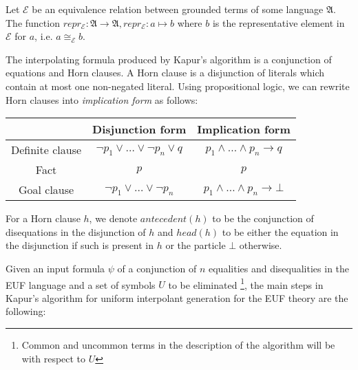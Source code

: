\begin{definition}
  Let $\mathcal{E}$ be an equivalence relation between grounded terms of some 
  language $\mathfrak{A}$. The function $repr_{\mathcal{E}} : \mathfrak{A} \rightarrow 
  \mathfrak{A} , repr_{\mathcal{E}} : a \mapsto b$  where $b$ is the representative
  element in $\mathcal{E}$ for $a$, i.e. $a \cong_{\mathcal{E}} b$.

\end{definition}

The interpolating formula produced by Kapur's algorithm is 
a conjunction of equations
and Horn clauses. A Horn clause is a disjunction of literals which 
contain at most
one non-negated literal. Using propositional logic, we can rewrite
Horn clauses into \emph{implication form} as follows:

\begin{table}[H]
  \centering
  \begin{tabular}{c|c|c}
    \toprule
    {} & Disjunction form & Implication form \\
    \toprule
    Definite clause & $\neg p_1 \lor \dots \lor \neg p_n \lor q$ & $p_1 \land \dots \land p_n \rightarrow q$ \\
    \midrule
    Fact & $p$ & $p$ \\
    \midrule
    Goal clause & $\neg p_1 \lor \dots \lor \neg p_n$ & $p_1 \land \dots \land p_n \rightarrow \bot$ \\
    \bottomrule
  \end{tabular}
\end{table}

For a Horn clause $h$,
we denote $antecedent(h)$ to be the conjunction of 
disequations in the disjunction of $h$ 
and $head(h)$ to be either the equation in the disjunction 
if such is present in $h$ 
or the particle $\bot$ otherwise.

Given an input formula $\psi$ of a conjunction of $n$ equalities and
disequalities in the EUF language and a set of symbols $U$ 
to be eliminated \footnote{Common and uncommon terms in the
description of the algorithm will be with respect to $U$}, 
the main steps in Kapur's algorithm for uniform 
interpolant generation for the EUF theory
are the following:

